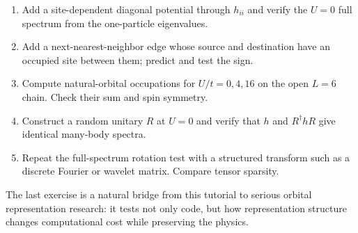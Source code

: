\begin{enumerate}
\item Add a site-dependent diagonal potential through $h_{ii}$ and verify the
      $U=0$ full spectrum from the one-particle eigenvalues.
\item Add a next-nearest-neighbor edge whose source and destination have an
      occupied site between them; predict and test the sign.
\item Compute natural-orbital occupations for $U/t=0,4,16$ on the open $L=6$
      chain.  Check their sum and spin symmetry.
\item Construct a random unitary $R$ at $U=0$ and verify that $h$ and
      $R^\dagger hR$ give identical many-body spectra.
\item Repeat the full-spectrum rotation test with a structured transform such
      as a discrete Fourier or wavelet matrix.  Compare tensor sparsity.
\end{enumerate}

The last exercise is a natural bridge from this tutorial to serious orbital
representation research: it tests not only code, but how representation
structure changes computational cost while preserving the physics.
